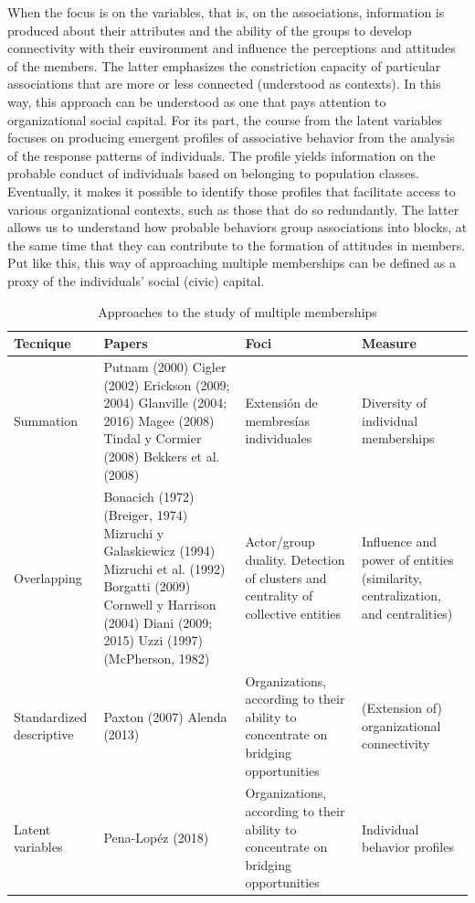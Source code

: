 When the focus is on the variables, that is, on the associations, information is produced about their attributes and the ability of the groups to develop connectivity with their environment and influence the perceptions and attitudes of the members. The latter emphasizes the constriction capacity of particular associations that are more or less connected (understood as contexts). In this way, this approach can be understood as one that pays attention to organizational social capital. For its part, the course from the latent variables focuses on producing emergent profiles of associative behavior from the analysis of the response patterns of individuals. The profile yields information on the probable conduct of individuals based on belonging to population classes. Eventually, it makes it possible to identify those profiles that facilitate access to various organizational contexts, such as those that do so redundantly. The latter allows us to understand how probable behaviors group associations into blocks, at the same time that they can contribute to the formation of attitudes in members. Put like this, this way of approaching multiple memberships can be defined as a proxy of the individuals' social (civic) capital.
\bigskip

\begin{table}[H]
\footnotesize 
\label{table: table1}
\setlength{\tymin}{40pt} %
\let\raggedright\RaggedRight

\begin{tabulary}{\textwidth}{@{}LLLL@{}}
\toprule
\textbf{Tecnique} &
  \textbf{Papers} &
  \textbf{Foci} &
  \textbf{Measure} \\
\midrule
Summation    & Putnam (2000) Cigler (2002) Erickson (2009; 2004) Glanville (2004; 2016) Magee (2008) Tindal y Cormier (2008) Bekkers et al. (2008) 
             & Extensión de membresías individuales
             & Diversity of individual memberships \\

Overlapping  & Bonacich (1972) (Breiger, 1974) Mizruchi y Galaskiewicz (1994) Mizruchi et al. (1992) Borgatti (2009) Cornwell y Harrison (2004) Diani (2009; 2015) Uzzi (1997) (McPherson, 1982) 
             & Actor/group duality. Detection of clusters and centrality of collective entities
             & Influence and power of entities (similarity, centralization, and centralities)\\
Standardized descriptive  & Paxton (2007) Alenda (2013) 
                          & Organizations, according to their ability to concentrate on bridging opportunities
                          & (Extension of) organizational connectivity\\
Latent variables  & Pena-Lopéz (2018)  
                  & Organizations, according to their ability to concentrate on bridging opportunities
                  & Individual behavior profiles\\
\bottomrule
\end{tabulary}

\caption{Approaches to the study of multiple memberships}
\label{}

\end{table}

